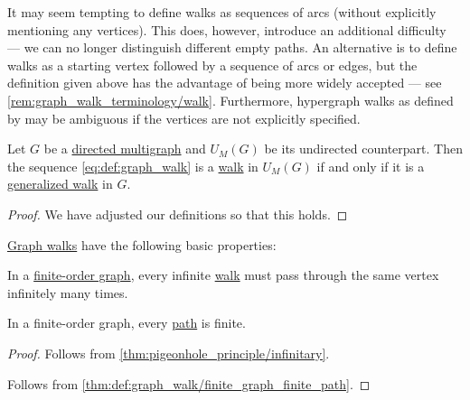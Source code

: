 \begin{comments}
  \item It may seem tempting to define walks as sequences of arcs (without explicitly mentioning any vertices). This does, however, introduce an additional difficulty --- we can no longer distinguish different empty paths. An alternative is to define walks as a starting vertex followed by a sequence of arcs or edges, but the definition given above has the advantage of being more widely accepted --- see \cref{rem:graph_walk_terminology/walk}. Furthermore, hypergraph walks as defined by \cite[300]{ЕмеличевИПр1990ТеорияГрафов} may be ambiguous if the vertices are not explicitly specified.
\end{comments}

\begin{proposition}\label{thm:walk_in_undirected_counterpart}
  Let \( G \) be a \hyperref[def:directed_multigraph]{directed multigraph} and \( \hyperref[def:graph_functors/multi_forgetful]{U_M}(G) \) be its undirected counterpart. Then the sequence \eqref{eq:def:graph_walk} is a \hyperref[def:graph_walk/undirected]{walk} in \( \hyperref[def:graph_functors/multi_forgetful]{U_M}(G) \) if and only if it is a \hyperref[def:graph_walk/generalized]{generalized walk} in \( G \).
\end{proposition}
\begin{proof}
  We have adjusted our definitions so that this holds.
\end{proof}

\begin{proposition}\label{thm:def:graph_walk}
  \hyperref[def:graph_walk]{Graph walks} have the following basic properties:
  \begin{thmenum}
     In a \hyperref[def:graph_cardinality/order]{finite-order graph}, every infinite \hyperref[def:graph_walk]{walk} must pass through the same vertex infinitely many times.

     In a finite-order graph, every \hyperref[def:graph_walk/path]{path} is finite.
  \end{thmenum}
\end{proposition}
\begin{proof}
   Follows from \cref{thm:pigeonhole_principle/infinitary}.

   Follows from \cref{thm:def:graph_walk/finite_graph_finite_path}.
\end{proof}

